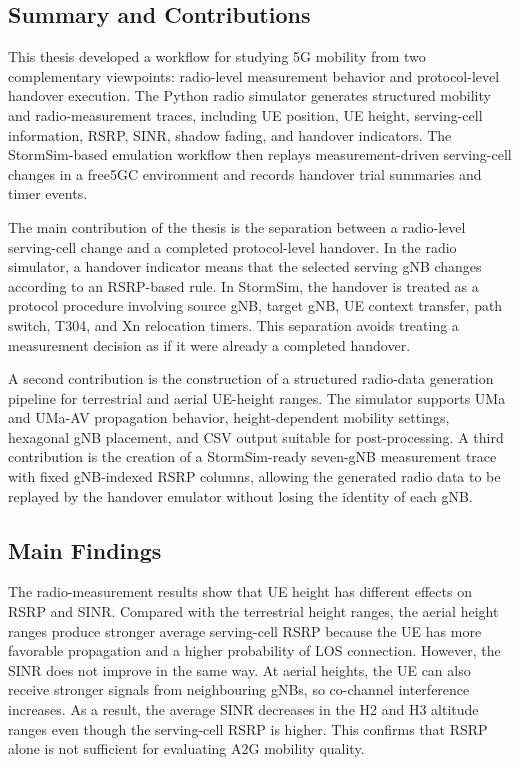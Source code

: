 \subsection{Summary and Contributions}

This thesis developed a workflow for studying 5G mobility from two complementary viewpoints: radio-level measurement behavior and protocol-level handover execution. The Python radio simulator generates structured mobility and radio-measurement traces, including UE position, UE height, serving-cell information, RSRP, SINR, shadow fading, and handover indicators. The StormSim-based emulation workflow then replays measurement-driven serving-cell changes in a free5GC environment and records handover trial summaries and timer events.

The main contribution of the thesis is the separation between a radio-level serving-cell change and a completed protocol-level handover. In the radio simulator, a handover indicator means that the selected serving gNB changes according to an RSRP-based rule. In StormSim, the handover is treated as a protocol procedure involving source gNB, target gNB, UE context transfer, path switch, T304, and Xn relocation timers. This separation avoids treating a measurement decision as if it were already a completed handover.

A second contribution is the construction of a structured radio-data generation pipeline for terrestrial and aerial UE-height ranges. The simulator supports UMa and UMa-AV propagation behavior, height-dependent mobility settings, hexagonal gNB placement, and CSV output suitable for post-processing. A third contribution is the creation of a StormSim-ready seven-gNB measurement trace with fixed gNB-indexed RSRP columns, allowing the generated radio data to be replayed by the handover emulator without losing the identity of each gNB.

\subsection{Main Findings}

The radio-measurement results show that UE height has different effects on RSRP and SINR. Compared with the terrestrial height ranges, the aerial height ranges produce stronger average serving-cell RSRP because the UE has more favorable propagation and a higher probability of LOS connection. However, the SINR does not improve in the same way. At aerial heights, the UE can also receive stronger signals from neighbouring gNBs, so co-channel interference increases. As a result, the average SINR decreases in the H2 and H3 altitude ranges even though the serving-cell RSRP is higher. This confirms that RSRP alone is not sufficient for evaluating A2G mobility quality.

